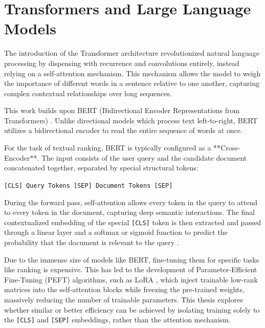 \section{Transformers and Large Language Models}
\label{sec:background_transformers}

The introduction of the Transformer architecture revolutionized natural language processing by dispensing with recurrence and convolutions entirely, instead relying on a self-attention mechanism. This mechanism allows the model to weigh the importance of different words in a sentence relative to one another, capturing complex contextual relationships over long sequences.

This work builds upon BERT (Bidirectional Encoder Representations from Transformers) \cite{devlin2018bert}. Unlike directional models which process text left-to-right, BERT utilizes a bidirectional encoder to read the entire sequence of words at once. 

For the task of textual ranking, BERT is typically configured as a **Cross-Encoder**. The input consists of the user query and the candidate document concatenated together, separated by special structural tokens:
\begin{center}
    \texttt{[CLS] Query Tokens [SEP] Document Tokens [SEP]}
\end{center}

During the forward pass, self-attention allows every token in the query to attend to every token in the document, capturing deep semantic interactions. The final contextualized embedding of the special \texttt{[CLS]} token is then extracted and passed through a linear layer and a softmax or sigmoid function to predict the probability that the document is relevant to the query \cite{nogueira2020document}.

Due to the immense size of models like BERT, fine-tuning them for specific tasks like ranking is expensive. This has led to the development of Parameter-Efficient Fine-Tuning (PEFT) algorithms, such as LoRA \cite{hu2021lora}, which inject trainable low-rank matrices into the self-attention blocks while freezing the pre-trained weights, massively reducing the number of trainable parameters. This thesis explores whether similar or better efficiency can be achieved by isolating training solely to the \texttt{[CLS]} and \texttt{[SEP]} embeddings, rather than the attention mechanism.
